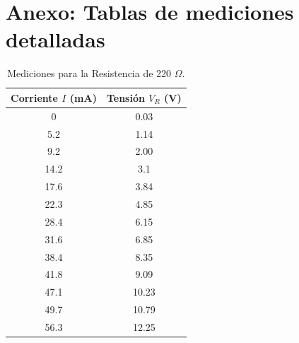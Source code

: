 \section{Anexo: Tablas de mediciones detalladas}

\begin{table}[htpb]
    \centering
    \begin{tabular}{cc}
        \toprule
        Corriente $I$ (mA) & Tensión $V_R$ (V) \\
        \midrule
        0	& 0.03 \\
        5.2	& 1.14 \\
        9.2	& 2.00 \\
        14.2	& 3.1 \\
        17.6	& 3.84 \\
        22.3	& 4.85 \\
        28.4	& 6.15 \\
        31.6	& 6.85 \\
        38.4	& 8.35 \\
        41.8	& 9.09 \\
        47.1	& 10.23 \\
        49.7	& 10.79 \\
        56.3	& 12.25 \\
        \bottomrule
    \end{tabular}
    \caption{Mediciones para la Resistencia de 220 $\Omega$.}
    \label{tab:res_220}
\end{table}

